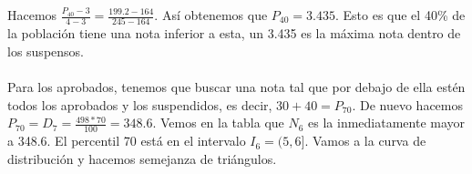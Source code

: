 \documentclass{article}
\begin{document}
    \begin{center}
    \end{center} 
    Hacemos $\frac{P_{40}-3}{4-3}=\frac{199.2-164}{245-164}$. Así obtenemos que $P_{40} = 3.435$. Esto es que el 40\% de la población tiene una nota inferior a esta, un 3.435 es la máxima nota dentro de los suspensos. \\ \\
    Para los aprobados, tenemos que buscar una nota tal que por debajo de ella estén todos los aprobados y los suspendidos, es decir, $30+40 = P_{70}$. De nuevo hacemos $P_{70}=D_{7}=\frac{498*70}{100}=348.6$. Vemos en la tabla que $N_{6}$ es la inmediatamente mayor a 348.6. El percentil 70 está en el intervalo $I_6 = (5,6]$. Vamos a la curva de distribución y hacemos semejanza de triángulos. \\
    
\end{document}

